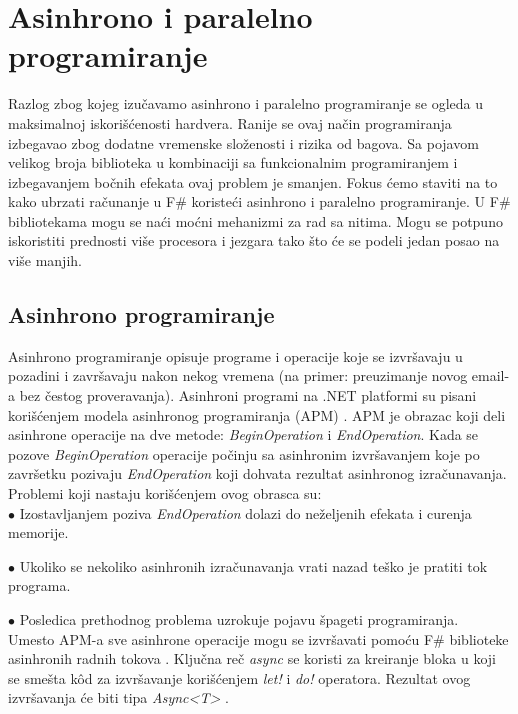 \documentclass[a4paper]{article}
\begin{document}
\section{Asinhrono i paralelno programiranje}
\label{sec:asinhrono_paralelno}

Razlog zbog kojeg izučavamo asinhrono i paralelno programiranje se ogleda u maksimalnoj iskorišćenosti hardvera. Ranije se ovaj način programiranja izbegavao zbog dodatne vremenske složenosti i rizika od bagova. Sa pojavom velikog broja biblioteka u kombinaciji sa funkcionalnim programiranjem i izbegavanjem bočnih efekata ovaj problem je smanjen. Fokus ćemo staviti na to kako ubrzati računanje u F\# koristeći asinhrono i paralelno programiranje. U F\# bibliotekama mogu se naći moćni mehanizmi za rad sa nitima. Mogu se potpuno iskoristiti prednosti više procesora i jezgara tako što će se podeli jedan posao na više manjih. 

\subsection{Asinhrono programiranje} 

Asinhrono programiranje opisuje programe i operacije koje se izvršavaju u pozadini i završavaju nakon nekog vremena (na primer: preuzimanje novog email-a bez čestog proveravanja). Asinhroni programi na .NET platformi su pisani korišćenjem modela asinhronog programiranja (APM) \cite{apm}. APM je obrazac koji deli asinhrone operacije na dve metode: {\em BeginOperation} i {\em EndOperation}. Kada se pozove {\em BeginOperation} operacije počinju sa asinhronim izvršavanjem koje po završetku pozivaju {\em EndOperation} koji dohvata rezultat asinhronog izračunavanja. Problemi koji nastaju korišćenjem ovog obrasca su: \\

$\bullet$ Izostavljanjem poziva {\em EndOperation} dolazi do neželjenih efekata i curenja memorije. 
 
$\bullet$ Ukoliko se nekoliko asinhronih izračunavanja vrati nazad teško je pratiti tok programa.
	
$\bullet$ Posledica prethodnog problema uzrokuje pojavu špageti programiranja. \\

Umesto APM-a sve asinhrone operacije mogu se izvršavati pomoću F\# biblioteke asinhronih radnih tokova \cite{progFs}. Ključna reč {\em async} se koristi za kreiranje bloka u koji se smešta kôd za izvršavanje korišćenjem {\em let!} i {\em do!} operatora. Rezultat ovog izvršavanja će biti tipa {\em Async<T>} \cite{progFs}.
\end{document}
